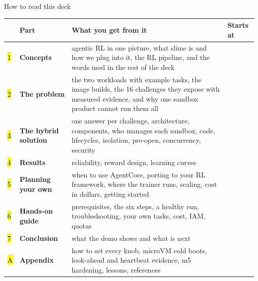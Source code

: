 \begin{frame}{How to read this deck}
\footnotesize\setlength{\tabcolsep}{5pt}
\begin{tabularx}{\textwidth}{@{}P{0.04\textwidth}P{0.22\textwidth}Y P{0.13\textwidth}@{}}
\toprule
& \textbf{Part} & \textbf{What you get from it} & \textbf{Starts at}\\
\midrule
\hl{1} & \textbf{Concepts} & agentic RL in one picture, what slime is and how we plug into it, the RL pipeline, and the words used in the rest of the deck & \\
\hl{2} & \textbf{The problem} & the two workloads with example tasks, the image builds, the 16 challenges they expose with measured evidence, and why one sandbox product cannot run them all & \\
\hl{3} & \textbf{The hybrid solution} & one answer per challenge, architecture, components, who manages each sandbox, code, lifecycles, isolation, pre-open, concurrency, security & \\
\hl{4} & \textbf{Results} & reliability, reward design, learning curves & \\
\hl{5} & \textbf{Planning your own} & when to use AgentCore, porting to your RL framework, where the trainer runs, scaling, cost in dollars, getting started & \\
\hl{6} & \textbf{Hands-on guide} & prerequisites, the six steps, a healthy run, troubleshooting, your own tasks, cost, IAM, quotas & \\
\hl{7} & \textbf{Conclusion} & what the demo shows and what is next & \\
\hl{A} & \textbf{Appendix} & how to set every knob, microVM cold boots, look-ahead and heartbeat evidence, m5 hardening, lessons, references & \\
\bottomrule
\end{tabularx}
\par\vspace{1mm}
\begin{columns}[T]
\end{columns}
\end{frame}

